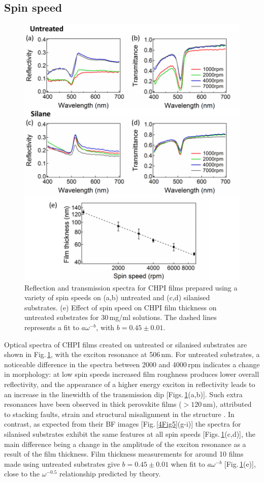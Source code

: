\subsection{Spin speed}
\begin{figure}[h!] 
\centering    
\includegraphics[width=\textwidth]{Fig6}
\caption{Reflection and transmission spectra for CHPI films prepared using a variety of spin speeds on (a,b) untreated and (c,d) silanised substrates. (e) Effect of spin speed on CHPI film thickness on untreated substrates for 30\,mg/ml solutions. The dashed lines represents a fit to $a\omega^{-b}$, with $b=0.45\pm0.01$.}
\label{4Fig6}
\end{figure}
Optical spectra of CHPI films created on untreated or silanised substrates are shown in Fig.\,\ref{4Fig6}, with the exciton resonance at 506\,nm. For untreated substrates, a noticeable difference in the spectra between 2000 and 4000\,rpm indicates a change in morphology: at low spin speeds increased film roughness produces lower overall reflectivity, and the appearance of a higher energy exciton in reflectivity leads to an increase in the linewidth of the transmission dip [Figs.\,\ref{4Fig6}(a,b)]. Such extra resonances have been observed in thick perovskite films ($>120$\,nm), attributed to stacking faults, strain and structural misalignment in the structure \cite{VijayaPrakash2009}. In contrast, as expected from their BF images [Fig.\,\ref{4Fig5}(g-i)] the spectra for silanised substrates exhibit the same features at all spin speeds [Figs.\,\ref{4Fig6}(c,d)], the main difference being a change in the amplitude of the exciton resonance as a result of the film thickness. Film thickness measurements for around 10 films made using untreated substrates give $b=0.45\pm0.01$ when fit to $a\omega^{-b}$ [Fig.\,\ref{4Fig6}(e)], close to the $\omega^{-0.5}$ relationship predicted by theory. 

